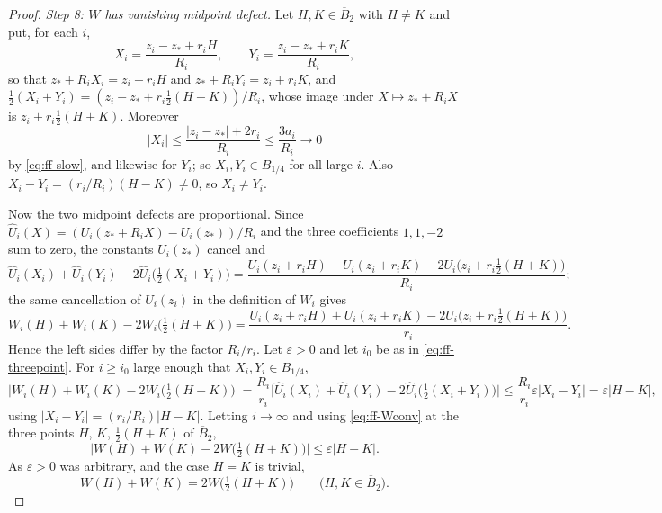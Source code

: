 \begin{proof}
\emph{Step 8: $W$ has vanishing midpoint defect.}
Let $H,K\in\overline B_2$ with $H\ne K$ and put, for each $i$,
\[
  X_i=\frac{z_i-z_*+r_iH}{R_i},\qquad
  Y_i=\frac{z_i-z_*+r_iK}{R_i},
\]
so that $z_*+R_iX_i=z_i+r_iH$ and $z_*+R_iY_i=z_i+r_iK$, and
$\tfrac12(X_i+Y_i)=(z_i-z_*+r_i\tfrac12(H+K))/R_i$, whose image under
$X\mapsto z_*+R_iX$ is $z_i+r_i\tfrac12(H+K)$. Moreover
\[
  |X_i|\le\frac{|z_i-z_*|+2r_i}{R_i}\le\frac{3a_i}{R_i}\longrightarrow0
\]
by \eqref{eq:ff-slow}, and likewise for $Y_i$; so $X_i,Y_i\in B_{1/4}$ for all
large $i$. Also $X_i-Y_i=(r_i/R_i)(H-K)\ne0$, so $X_i\ne Y_i$.

Now the two midpoint defects are proportional. Since
$\widehat U_i(X)=(U_i(z_*+R_iX)-U_i(z_*))/R_i$ and the three coefficients
$1,1,-2$ sum to zero, the constants $U_i(z_*)$ cancel and
\[
  \widehat U_i(X_i)+\widehat U_i(Y_i)
    -2\widehat U_i\bigl(\tfrac12(X_i+Y_i)\bigr)
  =\frac{U_i(z_i+r_iH)+U_i(z_i+r_iK)
          -2U_i\bigl(z_i+r_i\tfrac12(H+K)\bigr)}{R_i};
\]
the same cancellation of $U_i(z_i)$ in the definition of $W_i$ gives
\[
  W_i(H)+W_i(K)-2W_i\bigl(\tfrac12(H+K)\bigr)
  =\frac{U_i(z_i+r_iH)+U_i(z_i+r_iK)
          -2U_i\bigl(z_i+r_i\tfrac12(H+K)\bigr)}{r_i}.
\]
Hence the left sides differ by the factor $R_i/r_i$. Let $\varepsilon>0$ and let
$i_0$ be as in \eqref{eq:ff-threepoint}. For $i\ge i_0$ large enough that
$X_i,Y_i\in B_{1/4}$,
\[
  \bigl|W_i(H)+W_i(K)-2W_i\bigl(\tfrac12(H+K)\bigr)\bigr|
   =\frac{R_i}{r_i}\bigl|\widehat U_i(X_i)+\widehat U_i(Y_i)
      -2\widehat U_i\bigl(\tfrac12(X_i+Y_i)\bigr)\bigr|
   \le\frac{R_i}{r_i}\varepsilon|X_i-Y_i|=\varepsilon|H-K| ,
\]
using $|X_i-Y_i|=(r_i/R_i)|H-K|$. Letting $i\to\infty$ and using
\eqref{eq:ff-Wconv} at the three points $H$, $K$, $\tfrac12(H+K)$ of
$\overline B_2$,
\[
  \bigl|W(H)+W(K)-2W\bigl(\tfrac12(H+K)\bigr)\bigr|\le\varepsilon|H-K| .
\]
As $\varepsilon>0$ was arbitrary, and the case $H=K$ is trivial,
\begin{equation}\label{eq:ff-midpoint}
  W(H)+W(K)=2W\bigl(\tfrac12(H+K)\bigr)\qquad\bigl(H,K\in\overline B_2\bigr).
\end{equation}


\end{proof}
